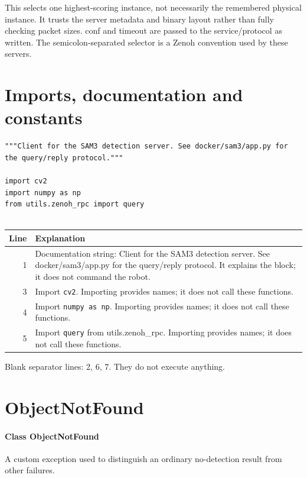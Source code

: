 \documentclass[11pt,a4paper]{book}
\begin{document}
This selects one highest-scoring instance, not necessarily the remembered physical instance. It trusts the server metadata and binary layout rather than fully checking packet sizes. conf and timeout are passed to the service/protocol as written. The semicolon-separated selector is a Zenoh convention used by these servers.

\section{Imports, documentation and constants}

\begin{lstlisting}[firstnumber=1]
"""Client for the SAM3 detection server. See docker/sam3/app.py for the query/reply protocol."""

import cv2
import numpy as np
from utils.zenoh_rpc import query


\end{lstlisting}

\begin{longtable}{r p{}}

\textbf{Line} & \textbf{Explanation} \\ \hline \endhead

1 & Documentation string: Client for the SAM3 detection server. See docker/sam3/app.py for the query/reply protocol. It explains the block; it does not command the robot. \\

3 & Import \texttt{cv2}. Importing provides names; it does not call these functions. \\

4 & Import \texttt{numpy as np}. Importing provides names; it does not call these functions. \\

5 & Import \texttt{query} from utils.zenoh\_rpc. Importing provides names; it does not call these functions. \\

\end{longtable}

Blank separator lines: 2, 6, 7. They do not execute anything.

\section{ObjectNotFound}

\paragraph{Class ObjectNotFound}
A custom exception used to distinguish an ordinary no-detection result from other failures.
\end{document}
